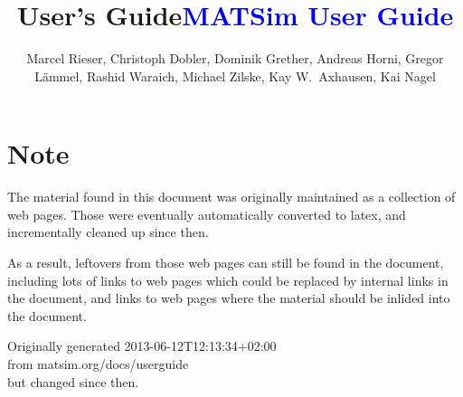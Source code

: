 \documentclass[a4paper,11pt]{report}
\title{User's Guide}
\newcommand{\NextFile}[1]{}
\begin{document}
\NextFile{index.html}

\title{\textcolor{blue}{\sf MATSim User Guide}}

\author{%
\begin{minipage}{0.9\hsize}
\begin{center}
Marcel Rieser, %
%
Christoph Dobler,
Dominik Grether,
Andreas Horni, 
Gregor Lämmel,
Rashid Waraich,
Michael Zilske,
%
Kay W.\ Axhausen, %
Kai Nagel %
\end{center}
\end{minipage}
}

\maketitle

\vfill\eject

\section*{Note}

The material found in this document was originally maintained as a collection of web pages.  Those were eventually automatically converted to latex, and incrementally cleaned up since then.  

As a result, leftovers from those web pages can still be found in the document, including lots of links to web pages which could be replaced by internal links in the document, and links to web pages where the material should be inlided into the document.


\vfill\eject

\tableofcontents

Originally generated 2013-06-12T12:13:34+02:00
\\from matsim.org/docs/userguide
\\but changed since then.












%



\vfill\eject
\end{document}
